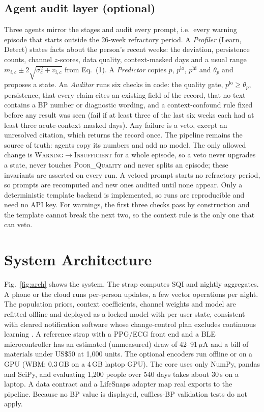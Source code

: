 \documentclass[conference]{IEEEtran}
\begin{document}
\subsection{Agent audit layer (optional)}
Three agents mirror the stages and audit every prompt, i.e.\ every warning episode that starts outside the 26-week refractory period. A \emph{Profiler} (Learn, Detect) states facts about the person's recent weeks: the deviation, persistence counts, channel $z$-scores, data quality, context-masked days and a usual range $m_{i,c}\pm2\sqrt{\sigma_c^2+v_{i,c}}$ from Eq.~(1). A \emph{Predictor} copies $p$, $p^{\mathrm{lo}}$, $p^{\mathrm{hi}}$ and $\theta_p$ and proposes a state. An \emph{Auditor} runs six checks in code: the quality gate, $p^{\mathrm{lo}}\geq\theta_p$, persistence, that every claim cites an existing field of the record, that no text contains a BP number or diagnostic wording, and a context-confound rule fixed before any result was seen (fail if at least three of the last six weeks each had at least three acute-context masked days). Any failure is a veto, except an unresolved citation, which returns the record once. The pipeline remains the source of truth: agents copy its numbers and add no model. The only allowed change is \textsc{Warning}$\to$\textsc{Insufficient} for a whole episode, so a veto never upgrades a state, never touches \textsc{Poor\_Quality} and never splits an episode; these invariants are asserted on every run. A vetoed prompt starts no refractory period, so prompts are recomputed and new ones audited until none appear. Only a deterministic template backend is implemented, so runs are reproducible and need no API key. For warnings, the first three checks pass by construction and the template cannot break the next two, so the context rule is the only one that can veto.

\section{System Architecture}
Fig.~\ref{fig:arch} shows the system. The strap computes SQI and nightly aggregates. A phone or the cloud runs per-person updates, a few vector operations per night. The population priors, context coefficients, channel weights and model are refitted offline and deployed as a locked model with per-user state, consistent with cleared notification software whose change-control plan excludes continuous learning \cite{k250507}. A reference strap with a PPG/ECG front end and a BLE microcontroller has an estimated (unmeasured) draw of 42--91\,$\mu$A and a bill of materials under US\$50 at 1,000 units. The optional encoders run offline or on a GPU (WBM: 0.3\,GB on a 4\,GB laptop GPU). The core uses only NumPy, pandas and SciPy, and evaluating 1,200 people over 540 days takes about 30\,s on a laptop. A data contract and a LifeSnaps adapter map real exports to the pipeline. Because no BP value is displayed, cuffless-BP validation tests \cite{stergiou2023} do not apply.
\end{document}
